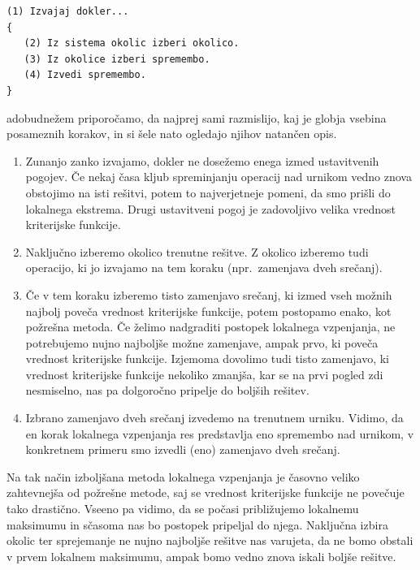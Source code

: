 \documentclass[a4paper, 10pt]{article}
\begin{document}
\begin{verbatim}
(1) Izvajaj dokler...
{
   (2) Iz sistema okolic izberi okolico.
   (3) Iz okolice izberi spremembo.
   (4) Izvedi spremembo.
}
\end{verbatim}

\noindent adobudnežem priporočamo, da najprej sami razmislijo, kaj je globja vsebina posameznih
korakov, in si šele nato ogledajo njihov natančen opis.

\begin{enumerate}
   \item Zunanjo zanko izvajamo, dokler ne dosežemo enega izmed ustavitvenih pogojev.
   Če nekaj časa kljub spreminjanju operacij nad urnikom vedno znova obstojimo na isti
   rešitvi, potem to najverjetneje pomeni, da smo prišli do lokalnega ekstrema. Drugi
   ustavitveni pogoj je zadovoljivo velika vrednost kriterijske funkcije.

   \item Naključno izberemo okolico trenutne rešitve. Z okolico izberemo tudi operacijo,
   ki jo izvajamo na tem koraku (npr.\ zamenjava dveh srečanj).

   \item Če v tem koraku izberemo tisto zamenjavo srečanj, ki izmed vseh možnih najbolj
   poveča vrednost kriterijske funkcije, potem postopamo enako, kot požrešna metoda. Če
   želimo nadgraditi postopek lokalnega vzpenjanja, ne potrebujemo nujno najboljše možne
   zamenjave, ampak prvo, ki poveča vrednost kriterijske funkcije. Izjemoma dovolimo tudi
   tisto zamenjavo, ki vrednost kriterijske funkcije nekoliko zmanjša, kar se na prvi
   pogled zdi nesmiselno, nas pa dolgoročno pripelje do boljših rešitev.

   \item Izbrano zamenjavo dveh srečanj izvedemo na trenutnem urniku. Vidimo, da en korak
   lokalnega vzpenjanja res predstavlja eno spremembo nad urnikom, v konkretnem primeru
   smo izvedli (eno) zamenjavo dveh srečanj.
\end{enumerate}

\noindent Na tak način izboljšana metoda lokalnega vzpenjanja je časovno veliko zahtevnejša od
požrešne metode, saj se vrednost kriterijske funkcije ne povečuje tako drastično. Vseeno
pa vidimo, da se počasi približujemo lokalnemu maksimumu in sčasoma nas bo postopek
pripeljal do njega. Naključna izbira okolic ter sprejemanje ne nujno najboljše rešitve
nas varujeta, da ne bomo obstali v prvem lokalnem maksimumu, ampak bomo vedno znova
iskali boljše rešitve.
\end{document}
